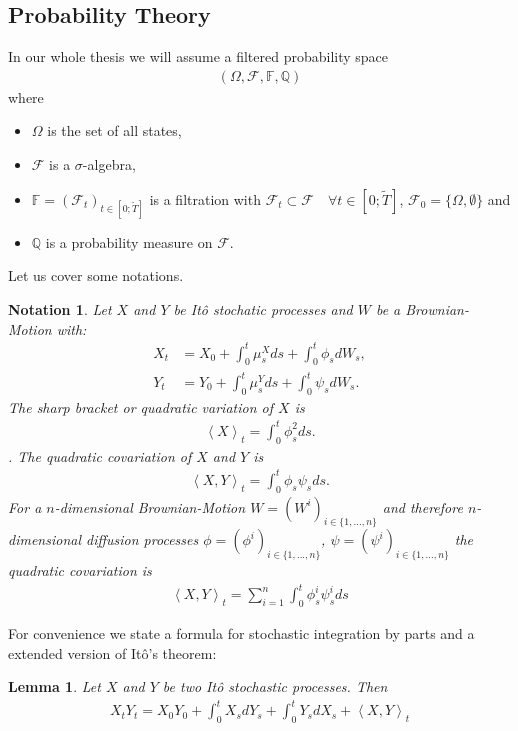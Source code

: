 \documentclass[12pt]{article}
\newtheorem{lemma}[theorem]{Lemma}
\newtheorem{notation}[theorem]{Notation}
\begin{document}
	\subsection{Probability Theory}
	In our whole thesis we will assume a filtered probability space
	\begin{align*}
		(\Omega, \mathcal{F}, \mathbb{F}, \mathbb{Q})
	\end{align*}
	where
	\begin{itemize}
		\item $\Omega$ is the set of all states,
		\item $\mathcal{F}$ is a $\sigma$-algebra,
		\item $\mathbb{F} = (\mathcal{F}_t)_{t \in \left[0;\tilde{T}\right]}$ is a filtration with $\mathcal{F}_t \subset \mathcal{F} \quad \forall t \in [0;\tilde{T}]$, $\mathcal{F}_0 = \{\Omega, \emptyset \}$ and
		\item $\mathbb{Q}$ is a probability measure on $\mathcal{F}$.
	\end{itemize}
	Let us cover some notations.
	\begin{notation}
		Let $X$ and $Y$ be Itô stochatic processes and $W$ be a Brownian-Motion with:
		\begin{align*}
			X_t &= X_0 + \int_{0}^{t}\mu^X_s ds + \int_{0}^{t}\phi_s dW_s, \\
			Y_t &= Y_0 + \int_{0}^{t}\mu^Y_s ds + \int_{0}^{t}\psi_s dW_s.
		\end{align*}
		The \emph{sharp bracket} or \emph{quadratic variation} of $X$ is 
		\begin{align*}
			\left\langle X \right\rangle_t = \int_{0}^{t}\phi_s^2 ds.
		\end{align*}.
		The \emph{quadratic covariation} of $X$ and $Y$ is 
		\begin{align*}
			\left\langle X, Y \right\rangle_t = \int_{0}^{t}\phi_s \psi_s ds.
		\end{align*}
		For a $n$-dimensional Brownian-Motion $W = (W^i)_{i\in\{1,...,n\}}$ and therefore $n$-dimensional diffusion processes $\phi=(\phi^i)_{i \in \{1,..., n\}}$, $\psi=(\psi^i)_{i \in \{1,..., n\}}$ the quadratic covariation is
		\begin{align*}
			\left\langle X, Y \right\rangle_t = \sum_{i=1}^{n} \int_{0}^{t} \phi^i_s \psi^i_s ds
		\end{align*}
	\end{notation}
	For convenience we state a formula for stochastic integration by parts and a extended version of Itô's theorem:
	\begin{lemma}
		Let $X$ and $Y$ be two Itô stochastic processes. Then
		\begin{align*}
			X_t Y_t = X_0 Y_0 + \int_{0}^{t}X_sdY_s + \int_{0}^{t}Y_sdX_s + \left\langle X, Y\right\rangle_t
		\end{align*}
	\end{lemma}
\end{document}
